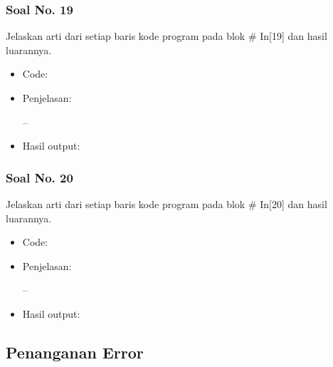 \subsubsection{Soal No. 19}
Jelaskan arti dari setiap baris kode program pada blok \# In[19] dan hasil luarannya.

\begin{itemize}
\item Code:


\item Penjelasan:

--

\item Hasil output:

\end{itemize}

\subsubsection{Soal No. 20}
Jelaskan arti dari setiap baris kode program pada blok \# In[20] dan hasil luarannya.

\begin{itemize}
\item Code:


\item Penjelasan:

--

\item Hasil output:


\end{itemize}


\subsection{Penanganan Error}
